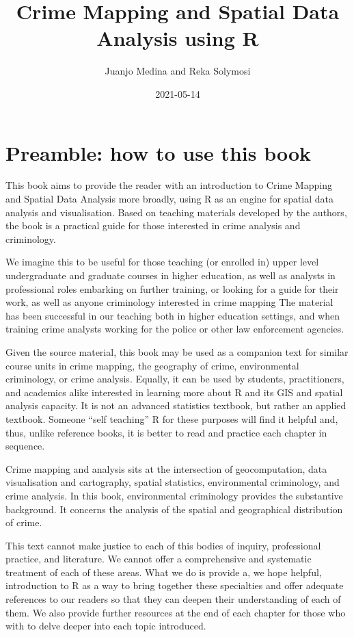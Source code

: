 \documentclass[
]{book}
\title{Crime Mapping and Spatial Data Analysis using R}
\author{Juanjo Medina and Reka Solymosi}
\date{2021-05-14}
\begin{document}
\maketitle

{
\setcounter{tocdepth}{1}
\tableofcontents
}
\hypertarget{preamble-how-to-use-this-book}{%
\chapter*{Preamble: how to use this book}\label{preamble-how-to-use-this-book}}

This book aims to provide the reader with an introduction to Crime Mapping and Spatial Data Analysis more broadly, using R as an engine for spatial data analysis and visualisation. Based on teaching materials developed by the authors, the book is a practical guide for those interested in crime analysis and criminology.

We imagine this to be useful for those teaching (or enrolled in) upper level undergraduate and graduate courses in higher education, as well as analysts in professional roles embarking on further training, or looking for a guide for their work, as well as anyone criminology interested in crime mapping The material has been successful in our teaching both in higher education settings, and when training crime analysts working for the police or other law enforcement agencies.

Given the source material, this book may be used as a companion text for similar course units in crime mapping, the geography of crime, environmental criminology, or crime analysis. Equally, it can be used by students, practitioners, and academics alike interested in learning more about R and its GIS and spatial analysis capacity. It is not an advanced statistics textbook, but rather an applied textbook. Someone ``self teaching'' R for these purposes will find it helpful and, thus, unlike reference books, it is better to read and practice each chapter in sequence.

Crime mapping and analysis sits at the intersection of geocomputation, data visualisation and cartography, spatial statistics, environmental criminology, and crime analysis. In this book, environmental criminology provides the substantive background. It concerns the analysis of the spatial and geographical distribution of crime.

This text cannot make justice to each of this bodies of inquiry, professional practice, and literature. We cannot offer a comprehensive and systematic treatment of each of these areas. What we do is provide a, we hope helpful, introduction to R as a way to bring together these specialties and offer adequate references to our readers so that they can deepen their understanding of each of them. We also provide further resources at the end of each chapter for those who with to delve deeper into each topic introduced.
\end{document}
